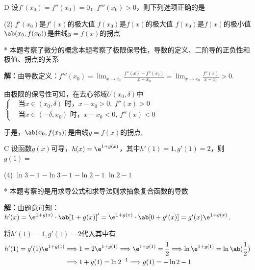 \begin{choice}{D}
    设$f'(x_0) =f''(x_0) =0$，$f'''(x_0) >0$，则下列选项正确的是
    \begin{tasks}(2)
        \task $f'(x_0) $是$f'(x)$的极大值
        \task $f(x_0)$是$f(x)$的极大值
        \task $f(x_0)$是$f(x)$的极小值
        \task $\ab(x_0,f(x_0))$是曲线$y=f(x)$的拐点
    \end{tasks}
\end{choice}
\begin{solution}*
    本题考察了微分的概念本题考察了极限保号性，导数的定义、二阶导的正负性和极值、拐点的关系
    
    \textbf{解：}由导数定义：$f'''(x_0) =\lim_{x\to x_0} \frac{f''(x) -f''(x_0)}{x-x_0}=\lim_{x\to x_0} \frac{f''(x)}{x-x_0}>0$.
    
    由极限的保号性可知，在去心邻域$\mathring{U}(x_0,\delta)$中$\left\{\begin{aligned}
        &\text{当} x\in (x_0,\delta)\text{ 时，}x-x_0>0,\ f''(x) >0\\
        &\text{当} x\in (-\delta,x_0)\text{ 时，}x-x_0<0,\ f''(x) <0
    \end{aligned}\right.$.

    于是，$\ab(x_0,f(x_0))$是曲线$y=f(x)$的拐点.
\end{solution}

\begin{choice}{C}
    设函数$g(x)$可导，$h(x) =\e^{1+g(x)}$，其中$h'(1) =1,g'(1) =2$，则$g(1) =$ 

    \begin{tasks}(4)
    \task $\ln 3-1$
    \task $-\ln 3-1$
    \task $-\ln 2-1$
    \task $\ln 2-1$
    \end{tasks}
\end{choice}
\begin{solution}*
    本题考察的是用求导公式和求导法则求抽象复合函数的导数

    \textbf{解：}由题意可知：
    $h'(x) =\e^{1+g(x)}\cdot\ab[1+g(x) ] '=\e^{1+g(x)}\cdot\ab[0+g'(x) ] =g'(x) \e^{1+g(x)}$.

    将$h'(1) =1,g'(1) =2$代入其中有
    \[
    \begin{aligned}
        h'(1) = g'(1) \e^{1+g(1)}&\Longrightarrow 1 = 2\e^{1+g(1)}\Longrightarrow \e^{1+g(1)} = \frac{1}{2}\Longrightarrow \ln\e^{1+g(1)} = \ln\ab(\frac{1}{2})\\
        &\Longrightarrow 1+g(1) = \ln 2^{-1}\Longrightarrow g(1) = -\ln 2 - 1
    \end{aligned}    
    \]
\end{solution}

